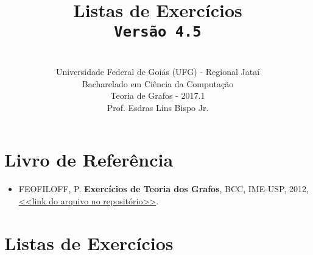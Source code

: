 \documentclass[12pt,a4paper,oneside]{article}
\author{\\Universidade Federal de Goiás (UFG) - Regional Jataí\\Bacharelado em Ciência da Computação \\Teoria de Grafos - 2017.1 \\Prof. Esdras Lins Bispo Jr.}
\date{}
\title{
	\sc \huge Listas de Exercícios 
	\\{\tt Versão 4.5}
}
\begin{document}
\maketitle

\section{Livro de Referência}
	\begin{itemize}
		\item FEOFILOFF, P. {\bf Exercícios de Teoria dos Grafos}, BCC, IME-USP, 2012, \href{https://github.com/bispojr/grafos/raw/master/2017.1/arquivos/exercicios-grafos.pdf}{<<link do arquivo no repositório>>}.
	\end{itemize}
	
\section{Listas de Exercícios}
\end{document}

